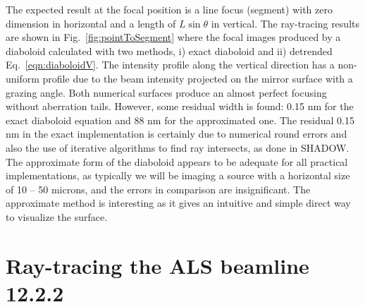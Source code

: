 \documentclass{iucr}              %
\newcommand{\inred}[1]{{\color{red}#1}}
\begin{document}
The expected result at the focal position is a line focus (segment) with zero dimension in horizontal and a length of $L\sin\theta$ in vertical. The ray-tracing results are shown in Fig.~\ref{fig:pointToSegment} where the focal images produced by a diaboloid calculated with two methods, i) exact diaboloid and ii) detrended Eq.~\ref{eqn:diaboloidV}.
The intensity profile along the vertical direction has a non-uniform profile due to the beam intensity projected on the mirror surface with a grazing angle.
Both numerical surfaces produce an almost perfect focusing without aberration tails. However, some residual width is found: 0.15 nm for the exact diaboloid equation and \inred{88} nm for the approximated one. 
The residual 0.15 nm in the exact implementation is certainly due to numerical round errors and also the use of iterative algorithms to find ray intersects, as done in SHADOW.
\inred{The approximate form of the diaboloid appears to be adequate for all practical implementations, as typically we will be imaging a source with a horizontal size of 10 – 50 microns, and the errors in comparison are insignificant.  The approximate method is interesting as it gives an intuitive and simple direct way to visualize the surface.}


\section{Ray-tracing the ALS beamline 12.2.2}
\label{sec:beamline}
\end{document}
